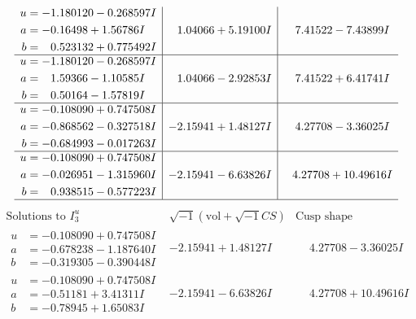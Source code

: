 \documentclass[1p]{elsarticle_modified}
\theoremstyle{definition}
\newcommand{\I}{\sqrt{-1}}
\begin{document}
$$\begin{array}{c|c|c}
\begin{aligned}
u &= -1.180120 - 0.268597 I \\
a &= -0.16498 + 1.56786 I \\
b &= \phantom{-}0.523132 + 0.775492 I\end{aligned}
 & \phantom{-}1.04066 + 5.19100 I & \phantom{-}7.41522 - 7.43899 I \\ \hline\begin{aligned}
u &= -1.180120 - 0.268597 I \\
a &= \phantom{-}1.59366 - 1.10585 I \\
b &= \phantom{-}0.50164 - 1.57819 I\end{aligned}
 & \phantom{-}1.04066 - 2.92853 I & \phantom{-}7.41522 + 6.41741 I \\ \hline\begin{aligned}
u &= -0.108090 + 0.747508 I \\
a &= -0.868562 - 0.327518 I \\
b &= -0.684993 - 0.017263 I\end{aligned}
 & -2.15941 + 1.48127 I & \phantom{-}4.27708 - 3.36025 I \\ \hline\begin{aligned}
u &= -0.108090 + 0.747508 I \\
a &= -0.026951 - 1.315960 I \\
b &= \phantom{-}0.938515 - 0.577223 I\end{aligned}
 & -2.15941 - 6.63826 I & \phantom{-}4.27708 + 10.49616 I\\
 \hline 
 \end{array}$$\newpage$$\begin{array}{c|c|c}  
\text{Solutions to }I^u_{3}& \I (\text{vol} + \sqrt{-1}CS) & \text{Cusp shape}\\
 \hline 
\begin{aligned}
u &= -0.108090 + 0.747508 I \\
a &= -0.678238 - 1.187640 I \\
b &= -0.319305 - 0.390448 I\end{aligned}
 & -2.15941 + 1.48127 I & \phantom{-}4.27708 - 3.36025 I \\ \hline\begin{aligned}
u &= -0.108090 + 0.747508 I \\
a &= -0.51181 + 3.41311 I \\
b &= -0.78945 + 1.65083 I\end{aligned}
 & -2.15941 - 6.63826 I & \phantom{-}4.27708 + 10.49616 I \\ \hline\begin{aligned}

\end{aligned}
\end{array}$$
\end{document}
